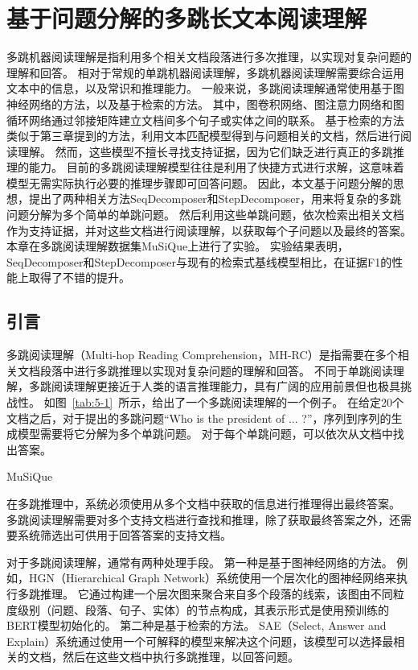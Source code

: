 \chapter{基于问题分解的多跳长文本阅读理解}
多跳机器阅读理解是指利用多个相关文档段落进行多次推理，以实现对复杂问题的理解和回答。
相对于常规的单跳机器阅读理解，多跳机器阅读理解需要综合运用文本中的信息，以及常识和推理能力。
一般来说，多跳阅读理解通常使用基于图神经网络的方法，以及基于检索的方法。
其中，图卷积网络、图注意力网络和图循环网络通过邻接矩阵建立文档间多个句子或实体之间的联系。
基于检索的方法类似于第三章提到的方法，利用文本匹配模型得到与问题相关的文档，然后进行阅读理解。
然而，这些模型不擅长寻找支持证据，因为它们缺乏进行真正的多跳推理的能力。
目前的多跳阅读理解模型往往是利用了快捷方式进行求解，这意味着模型无需实际执行必要的推理步骤即可回答问题。
因此，本文基于问题分解的思想，提出了两种相关方法SeqDecomposer和StepDecomposer，用来将复杂的多跳问题分解为多个简单的单跳问题。
然后利用这些单跳问题，依次检索出相关文档作为支持证据，并对这些文档进行阅读理解，以获取每个子问题以及最终的答案。
本章在多跳阅读理解数据集MuSiQue上进行了实验。
实验结果表明，SeqDecomposer和StepDecomposer与现有的检索式基线模型相比，在证据F1的性能上取得了不错的提升。

\section{引言}
多跳阅读理解\cite{Yang2018HotpotQAAD}（Multi-hop Reading Comprehension，MH-RC）是指需要在多个相关文档段落中进行多跳推理以实现对复杂问题的理解和回答。
不同于单跳阅读理解，多跳阅读理解更接近于人类的语言推理能力，具有广阔的应用前景但也极具挑战性。
如图~\ref{tab:5-1}~所示，给出了一个多跳阅读理解的一个例子。
在给定20个文档之后，对于提出的多跳问题“Who is the president of ... ?”，序列到序列的生成模型需要将它分解为多个单跳问题。
对于每个单跳问题，可以依次从文档中找出答案。

MuSiQue

在多跳推理中，系统必须使用从多个文档中获取的信息进行推理得出最终答案。
多跳阅读理解需要对多个支持文档进行查找和推理，除了获取最终答案之外，还需要系统筛选出可供用于回答答案的支持文档。

对于多跳阅读理解，通常有两种处理手段。
第一种是基于图神经网络的方法。
例如，HGN\cite{Fang2019HierarchicalGN}（Hierarchical Graph Network）系统使用一个层次化的图神经网络来执行多跳推理。
它通过构建一个层次图来聚合来自多个段落的线索，该图由不同粒度级别（问题、段落、句子、实体）的节点构成，其表示形式是使用预训练的BERT模型初始化的。
第二种是基于检索的方法。
SAE\cite{Tu2019SelectAA}（Select, Answer and Explain）系统通过使用一个可解释的模型来解决这个问题，该模型可以选择最相关的文档，然后在这些文档中执行多跳推理，以回答问题。

